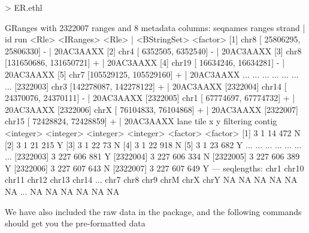 \documentclass[12pt]{article}
\begin{document}
\begin{Schunk}
\begin{Sinput}
> ER.ethl
\end{Sinput}
\begin{Soutput}
GRanges with 2322007 ranges and 8 metadata columns:
            seqnames                 ranges strand   |           id       run
               <Rle>              <IRanges>  <Rle>   | <BStringSet>  <factor>
        [1]     chr8 [ 25806295,  25806330]      -   |              20AC3AAXX
        [2]     chr4 [  6352505,   6352540]      -   |              20AC3AAXX
        [3]     chr8 [131650686, 131650721]      +   |              20AC3AAXX
        [4]    chr19 [ 16634246,  16634281]      -   |              20AC3AAXX
        [5]     chr7 [105529125, 105529160]      +   |              20AC3AAXX
        ...      ...                    ...    ... ...          ...       ...
  [2322003]     chr3 [142278087, 142278122]      +   |              20AC3AAXX
  [2322004]    chr14 [ 24370076,  24370111]      -   |              20AC3AAXX
  [2322005]     chr1 [ 67774697,  67774732]      +   |              20AC3AAXX
  [2322006]     chrX [ 76104833,  76104868]      +   |              20AC3AAXX
  [2322007]    chr15 [ 72428824,  72428859]      +   |              20AC3AAXX
                 lane      tile         x         y filtering   contig
            <integer> <integer> <integer> <integer>  <factor> <factor>
        [1]         3         1        14       472         N         
        [2]         3         1        21       215         Y         
        [3]         3         1        22        73         N         
        [4]         3         1        22       918         N         
        [5]         3         1        23       682         Y         
        ...       ...       ...       ...       ...       ...      ...
  [2322003]         3       227       606       881         Y         
  [2322004]         3       227       606       334         N         
  [2322005]         3       227       606       389         Y         
  [2322006]         3       227       607       643         N         
  [2322007]         3       227       607       649         Y         
  ---
  seqlengths:
    chr1 chr10 chr11 chr12 chr13 chr14 ...  chr7  chr8  chr9  chrM  chrX  chrY
      NA    NA    NA    NA    NA    NA ...    NA    NA    NA    NA    NA    NA
\end{Soutput}
\end{Schunk}
We have also included the raw data in the package, and the following commands should get you the pre-formatted data
\end{document}
